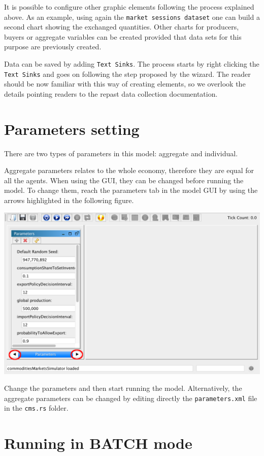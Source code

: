 \documentclass{article}
\begin{document}
It is possible to configure other graphic elements following the process explained above. As an example, using again the \verb+market sessions dataset+ one can build a second chart showing the exchanged quantities. 
Other charts for producers, buyers or aggregate variables can be created provided that data sets for this purpose are previously created. 

Data can be saved by adding \verb+Text Sinks+. The process starts by right clicking the \verb+Text Sinks+ and goes on following the step proposed by the wizard. The reader should be now familiar with this way of creating elements, so we overlook the details pointing readers to the repast data collection documentation. 


\section{Parameters setting}\label{sec:parameters}

There are two types of parameters in this model: aggregate and individual. 

Aggregate parameters relates to the whole economy, therefore they are equal for all the agents. When using the GUI, they can be changed before running the model. To change them, reach the parameters tab in the model GUI by using the arrows highlighted in the following figure.

\includegraphics[scale=0.35]{fig_cms_rs_parameters}

Change the parameters and then start running the model. Alternatively, the aggregate parameters can be changed by editing directly the \verb+parameters.xml+ file in the \verb+cms.rs+ folder.


\section{Running in BATCH mode}
\end{document}
